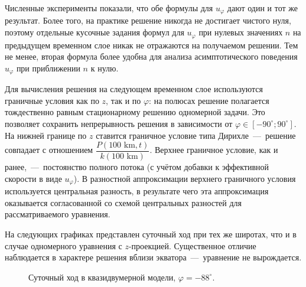 \documentclass[14pt, a4paper, fleqn, twoside]{extreport}
\begin{document}
Численные эксперименты показали, что обе формулы для $u_\varphi$ дают один и тот же результат. Более того, на практике решение никогда не достигает чистого нуля, поэтому отдельные кусочные задания формул для $u_\varphi$ при нулевых значениях $n$ на предыдущем временном слое никак не отражаются на получаемом решении. Тем не менее, вторая формула более удобна для анализа асимптотического поведения $u_\varphi$ при приближении $n$ к нулю.

Для вычисления решения на следующем временном слое используются граничные условия как по $z$, так и по $\varphi$: на полюсах решение полагается тождественно равным стационарному решению одномерной задачи. Это позволяет сохранить непрерывность решения в зависимости от $\varphi \in [-90^\circ; 90^\circ]$. На нижней границе по $z$ ставится граничное условие типа Дирихле~---~решение совпадает с отношением $\dfrac{P(100\mbox{ km}, t)}{k(100\mbox{ km})}$. Верхнее граничное условие, как и ранее,~---~постоянство полного потока (с учётом добавки к эффективной скорости в виде $u_\varphi$). В разностной аппроксимации верхнего граничного условия используется центральная разность, в результате чего эта аппроксимация оказывается согласованной со схемой центральных разностей для рассматриваемого уравнения.

На следующих графиках представлен суточный ход при тех же широтах, что и в случае одномерного уравнения с $z$-проекцией. Существенное отличие наблюдается в характере решения вблизи экватора~---~уравнение не вырождается.

\begin{figure}[H]
\caption{Суточный ход в квазидвумерной модели, $\varphi = -88^\circ$.}
\end{figure}
\end{document}
